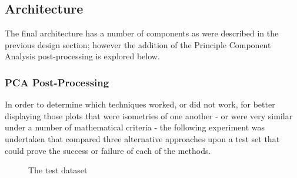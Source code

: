 \documentclass[a4paper,11pt,titlepage]{article}
\begin{document}
	\subsection{Architecture}
	The final architecture has a number of components as were described in the previous design section; however the addition of the Principle Component Analysis post-processing is explored below. 
	\par 
	
	\subsubsection{PCA Post-Processing}
	In order to determine which techniques worked, or did not work, for better displaying those plots that were isometries of one another - or were very similar under a number of mathematical criteria - the following experiment was undertaken that compared three alternative approaches upon a test set that could prove the success or failure of each of the methods.
	\par 
		
	\begin{figure}[H]
    			\caption{The test dataset}%
	\end{figure}	
	
\end{document}
